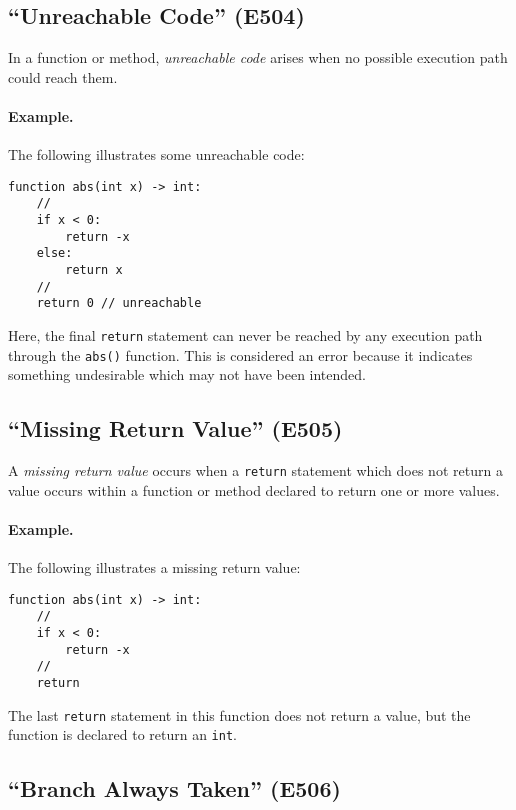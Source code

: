 \subsection{``Unreachable Code'' (E504)}

In a function or method, {\em unreachable code} arises when no possible execution path could reach them.  

\paragraph{Example.} The following illustrates some unreachable code:

\begin{lstlisting}
function abs(int x) -> int:
    //
    if x < 0:
        return -x
    else:
        return x
    //
    return 0 // unreachable
\end{lstlisting}

Here, the final \lstinline{return} statement can never be reached by any execution path through the \lstinline{abs()} function.  This is considered an error because it indicates something undesirable which may not have been intended.

\subsection{``Missing Return Value'' (E505)}

A {\em missing return value} occurs when a \lstinline{return} statement which does not return a value occurs within a function or method declared to return one or more values.  

\paragraph{Example.} The following illustrates a missing return value:

\begin{lstlisting}
function abs(int x) -> int:
    //
    if x < 0:
        return -x
    //
    return
\end{lstlisting}

The last \lstinline{return} statement in this function does not return a value, but the function is declared to return an \lstinline{int}.

\subsection{``Branch Always Taken'' (E506)}

